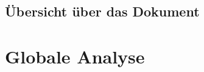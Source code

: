 \documentclass[fontsize=12pt,paper=a4,twoside]{scrartcl}
\begin{document}
\subsection{Übersicht über das Dokument}


\section{Globale Analyse} \label{sec:globale_analyse}




\end{document}
